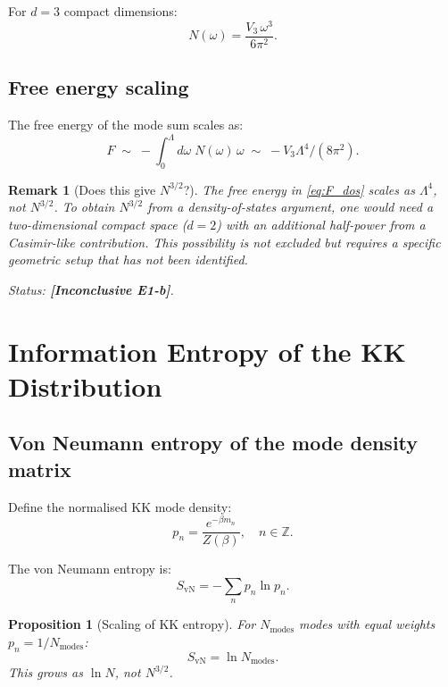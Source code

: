 \documentclass[11pt,a4paper]{article}
\newtheorem{proposition}{Proposition}
\newtheorem{remark}{Remark}
\begin{document}
For $d = 3$ compact dimensions:
\begin{equation}
  N(\omega) = \frac{V_3\,\omega^3}{6\pi^2}.
\end{equation}

\subsection{Free energy scaling}

The free energy of the mode sum scales as:
\begin{equation}
\label{eq:F_dos}
  F \;\sim\; -\int_0^\Lambda d\omega\; N(\omega)\, \omega
  \;\sim\; -V_3 \Lambda^4 / (8\pi^2).
\end{equation}

\begin{remark}[Does this give $N^{3/2}$?]
  The free energy in \eqref{eq:F_dos} scales as $\Lambda^4$, not $N^{3/2}$.
  To obtain $N^{3/2}$ from a density-of-states argument, one would need
  a two-dimensional compact space ($d=2$) with an additional half-power
  from a Casimir-like contribution.  This possibility is not excluded but
  requires a specific geometric setup that has not been identified.

  Status: \textbf{[Inconclusive E1-b]}.
\end{remark}

\section{Information Entropy of the KK Distribution}
\label{sec:info}

\subsection{Von Neumann entropy of the mode density matrix}

Define the normalised KK mode density:
\begin{equation}
  p_n = \frac{e^{-\beta m_n}}{Z(\beta)}, \quad n \in \mathbb{Z}.
\end{equation}

The von Neumann entropy is:
\begin{equation}
\label{eq:vn_entropy}
  S_{\mathrm{vN}} = -\sum_{n} p_n \ln p_n.
\end{equation}

\begin{proposition}[Scaling of KK entropy]\label{prop:kk_entropy}
  For $N_{\mathrm{modes}}$ modes with equal weights $p_n = 1/N_{\mathrm{modes}}$:
  \begin{equation}
    S_{\mathrm{vN}} = \ln N_{\mathrm{modes}}.
  \end{equation}
  This grows as $\ln N$, not $N^{3/2}$.
\end{proposition}
\end{document}
